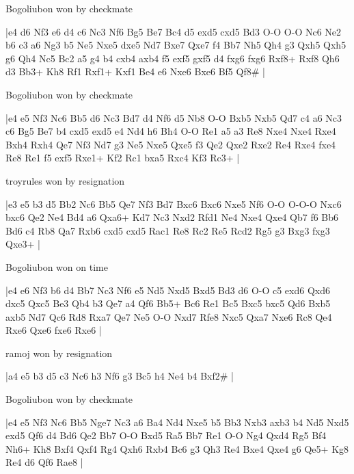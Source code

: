 \showboard

Bogoliubon won by checkmate

\makegametitle
|e4 d6 Nf3 e6 d4 c6 Nc3 Nf6 Bg5 Be7 Bc4 d5 exd5 cxd5 Bd3 O-O O-O Nc6 Ne2 b6 c3 a6 Ng3 b5 Ne5 Nxe5 dxe5 Nd7 Bxe7 Qxe7 f4 Bb7 Nh5 Qh4 g3 Qxh5 Qxh5 g6 Qh4 Nc5 Bc2 a5 g4 b4 cxb4 axb4 f5 exf5 gxf5 d4 fxg6 fxg6 Rxf8+ Rxf8 Qh6 d3 Bb3+ Kh8 Rf1 Rxf1+ Kxf1 Be4 e6 Nxe6 Bxe6 Bf5 Qf8\#  |

\showboard

Bogoliubon won by checkmate

\makegametitle
|e4 e5 Nf3 Nc6 Bb5 d6 Nc3 Bd7 d4 Nf6 d5 Nb8 O-O Bxb5 Nxb5 Qd7 c4 a6 Nc3 c6 Bg5 Be7 b4 cxd5 exd5 e4 Nd4 h6 Bh4 O-O Re1 a5 a3 Re8 Nxe4 Nxe4 Rxe4 Bxh4 Rxh4 Qe7 Nf3 Nd7 g3 Ne5 Nxe5 Qxe5 f3 Qe2 Qxe2 Rxe2 Re4 Rxe4 fxe4 Re8 Re1 f5 exf5 Rxe1+ Kf2 Rc1 bxa5 Rxc4 Kf3 Rc3+  |

\showboard

troyrules won by resignation

\makegametitle
|e3 e5 b3 d5 Bb2 Nc6 Bb5 Qe7 Nf3 Bd7 Bxc6 Bxc6 Nxe5 Nf6 O-O O-O-O Nxc6 bxc6 Qe2 Ne4 Bd4 a6 Qxa6+ Kd7 Nc3 Nxd2 Rfd1 Ne4 Nxe4 Qxe4 Qb7 f6 Bb6 Bd6 c4 Rb8 Qa7 Rxb6 cxd5 cxd5 Rac1 Re8 Rc2 Re5 Rcd2 Rg5 g3 Bxg3 fxg3 Qxe3+  |

\showboard

Bogoliubon won on time

\makegametitle
|e4 e6 Nf3 b6 d4 Bb7 Nc3 Nf6 e5 Nd5 Nxd5 Bxd5 Bd3 d6 O-O c5 exd6 Qxd6 dxc5 Qxc5 Be3 Qb4 b3 Qe7 a4 Qf6 Bb5+ Bc6 Re1 Bc5 Bxc5 bxc5 Qd6 Bxb5 axb5 Nd7 Qc6 Rd8 Rxa7 Qe7 Ne5 O-O Nxd7 Rfe8 Nxc5 Qxa7 Nxe6 Rc8 Qe4 Rxe6 Qxe6 fxe6 Rxe6  |

\showboard

ramoj won by resignation

\makegametitle
|a4 e5 b3 d5 c3 Nc6 h3 Nf6 g3 Bc5 h4 Ne4 b4 Bxf2\#  |

\showboard

Bogoliubon won by checkmate

\makegametitle
|e4 e5 Nf3 Nc6 Bb5 Nge7 Nc3 a6 Ba4 Nd4 Nxe5 b5 Bb3 Nxb3 axb3 b4 Nd5 Nxd5 exd5 Qf6 d4 Bd6 Qe2 Bb7 O-O Bxd5 Ra5 Bb7 Re1 O-O Ng4 Qxd4 Rg5 Bf4 Nh6+ Kh8 Bxf4 Qxf4 Rg4 Qxh6 Rxb4 Bc6 g3 Qh3 Re4 Bxe4 Qxe4 g6 Qe5+ Kg8 Re4 d6 Qf6 Rae8  |

